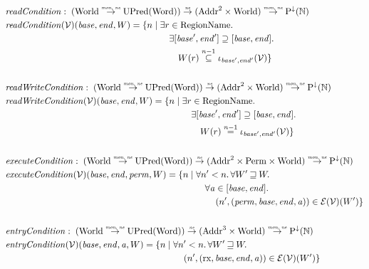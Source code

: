 \documentclass{article}
\newcommand{\monnefun}{\stackrel{\textit{\tiny{mon, ne}}}{\rightarrow}}
\newcommand{\nefun}{\stackrel{\textit{\tiny{ne}}}{\rightarrow}}
\newcommand{\nequal}[1][n]{\stackrel{\tiny{#1}}{=}}
\newcommand{\nsubeq}[1][n]{\stackrel{\tiny{#1}}{\subseteq}}
\newcommand{\var}[1]{\mathit{#1}}
\newcommand{\addr}{\var{a}}
\newcommand{\start}{\var{base}}
\newcommand{\addrend}{\var{end}}
\newcommand{\perm}{\var{perm}}
\newcommand{\plainfun}[2]{
  \ifthenelse{\equal{#2}{}}
             {\mathit{#1}}
             {\mathit{#1}(#2)}
}
\newcommand{\readCond}[1]{\plainfun{readCondition}{#1}}
\newcommand{\writeCond}[1]{\plainfun{readWriteCondition}{#1}}
\newcommand{\execCond}[1]{\plainfun{executeCondition}{#1}}
\newcommand{\entryCond}[1]{\plainfun{entryCondition}{#1}}
\newcommand{\future}{\mathbin{\sqsupseteq}}
\newcommand{\asmType}{\plaindom{AsmType}}
\newcommand{\plaindom}[1]{\mathrm{#1}}
\newcommand{\Words}{\plaindom{Word}}
\newcommand{\Addrs}{\plaindom{Addr}}
\newcommand{\nats}{\mathbb{N}}
\newcommand{\Perms}{\plaindom{Perm}}
\newcommand{\RegionNames}{\plaindom{RegionName}}
\newcommand{\Worlds}{\plaindom{World}}
\newcommand{\UPred}[1]{\plaindom{UPred}(#1)}
\newcommand{\DCPred}[1]{\plaindom{P}^\downarrow(#1)}
\newcommand{\intr}[2]{\mathcal{#1}}
\newcommand{\valueintr}[1]{\intr{V}{#1}}
\newcommand{\exprintr}[1]{\intr{E}{#1}}
\newcommand{\stdvr}{\valueintr{\asmType}}
\newcommand{\stder}{\exprintr{\asmType}}
\newcommand{\npair}[2][n]{\left(#1,#2 \right)}
\newcommand{\plainperm}[1]{\mathrm{#1}}
\newcommand{\exec}{\plainperm{rx}}
\begin{document}
\begin{align*}
  & \readCond{} : \; (\Worlds \monnefun \UPred{\Words}) \nefun (\Addrs^2 \times \Worlds) \monnefun \DCPred{\nats} \\
  & \readCond{}(\stdvr)(\start,\addrend,W) =        
  \begin{aligned}[t]
    \{ n \mid & \;\exists r \in \RegionNames \ldotp \\
              & \;\quad \exists [\start',\addrend'] \supseteq [\start,\addrend] \ldotp \\
              & \;\qquad W(r)\nsubeq[n-1] \iota_{\start',\addrend'}(\stdvr) \}
  \end{aligned}\\
 & \\
  & \writeCond{} : \; (\Worlds \monnefun \UPred{\Words}) \nefun (\Addrs^2 \times \Worlds) \monnefun \DCPred{\nats} \\
  & \writeCond{}(\stdvr)(\start,\addrend, W) = 
  \begin{aligned}[t]
    \{ n \mid & \; \exists r \in \RegionNames \ldotp \\
              & \;\quad \exists [\start',\addrend'] \supseteq [\start,\addrend] \ldotp \\
              & \; \qquad W(r) \nequal[n-1] \iota_{\start',\addrend'}(\stdvr)  \}
  \end{aligned}\\
 & \\
  & \execCond{} : \; (\Worlds \monnefun \UPred{\Words}) \nefun (\Addrs^2 \times \Perms \times \Worlds) \monnefun \DCPred{\nats} \\
  & \execCond{}(\stdvr)(\start,\addrend,\perm,W) = 
  \begin{aligned}[t]
    \{ n \mid & \; \forall n' < n \ldotp \forall W' \future W \ldotp \\
              & \; \quad \forall \addr \in [\start,\addrend] \ldotp \\
              & \; \qquad \npair[n']{(\perm,\start,\addrend,\addr)} \in \stder(\stdvr)(W') \}
  \end{aligned} \\
 & \\
  & \entryCond{} : \;  (\Worlds \monnefun \UPred{\Words}) \nefun (\Addrs^3 \times \Worlds) \monnefun \DCPred{\nats} \\
  & \entryCond{}(\stdvr)(\start,\addrend,\addr,W) =
  \begin{aligned}[t]
    \{ n \mid & \; \forall n' < n \ldotp \forall W' \future W \ldotp \\
              & \; \quad \npair[n']{(\exec,\start,\addrend,\addr)} \in \stder(\stdvr)(W') \}
  \end{aligned}
\end{align*}
\end{document}
